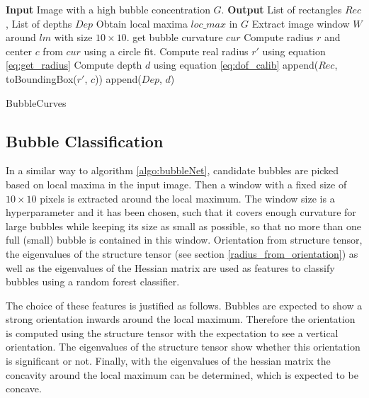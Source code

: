 		\begin{algorithm}
			\begin{algorithmic}[1]
				\State \textbf{Input} Image with a high bubble concentration $G$. 
				\State \textbf{Output} List of rectangles $Rec$, List of depths $Dep$
				\State Obtain local maxima $loc\_max$ in $G$
					\State Extract image window $W$ around $lm$ with size $10 \times 10$.
						\State get bubble curvature $cur$ 
						\State Compute radius $r$ and center $c$ from $cur$ using a circle fit.
						\State Compute real radius $r'$ using equation \ref{eq:get_radius}
						\State Compute depth $d$ using equation \ref{eq:dof_calib}
						\State append($Rec$, toBoundingBox($r'$, $c$))
						\State append($Dep$, $d$)
					\EndIf
				\EndFor
			\end{algorithmic}
			
			\caption{BubbleCurves}
			\label{algo:bubbleCurves}
		\end{algorithm}
	
	
	
	
	
	
	\subsection{Bubble Classification}\label{bubble_classification}
		In a similar way to algorithm \ref{algo:bubbleNet}, candidate bubbles are picked based on local maxima in the input image. Then a window with a fixed size of $10 \times 10$ pixels is extracted around the local maximum. The window size is a hyperparameter and it has been chosen, such that it covers enough curvature for large bubbles while keeping its size as small as possible, so that no more than one full (small) bubble is contained in this window. 
		 Orientation from structure tensor, the eigenvalues of the structure tensor (see section \ref{radius_from_orientation}) as well as the eigenvalues of the Hessian matrix are used as features to classify bubbles using a random forest classifier. 
		
		The choice of these features is justified as follows. Bubbles are expected to show a strong orientation inwards around the local maximum. Therefore the orientation is computed using the structure tensor with the expectation to see a vertical orientation. The eigenvalues of the structure tensor show whether this orientation is significant or not. Finally, with the eigenvalues of the hessian matrix the concavity around the local maximum can be determined, which is expected to be concave. 
		
